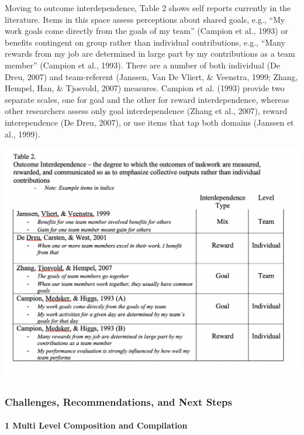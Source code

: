 \documentclass[english,,man]{apa6}
\let\oldparagraph\paragraph
\renewcommand{\paragraph}[1]{\oldparagraph{#1}\mbox{}}
\theoremstyle{definition}
\theoremstyle{definition}
\theoremstyle{definition}
\theoremstyle{remark}
\begin{document}
Moving to outcome interdependence, Table 2 shows self reports currently
in the literature. Items in this space assess perceptions about shared
goals, e.g., \enquote{My work goals come directly from the goals of my
team} (Campion et al., 1993) or benefits contingent on group rather than
individual contributions, e.g., \enquote{Many rewards from my job are
determined in large part by my contributions as a team member} (Campion
et al., 1993). There are a number of both individual (De Dreu, 2007) and
team-referent (Janssen, Van De Vliert, \& Veenstra, 1999; Zhang, Hempel,
Han, \& Tjosvold, 2007) measures. Campion et al. (1993) provide two
separate scales, one for goal and the other for reward interdependence,
whereas other researchers assess only goal interdependence (Zhang et
al., 2007), reward interependence (De Dreu, 2007), or use items that tap
both domains (Janssen et al., 1999).

\includegraphics{images/table2.png}

\hypertarget{challenges-recommendations-and-next-steps}{%
\subsubsection{Challenges, Recommendations, and Next
Steps}\label{challenges-recommendations-and-next-steps}}

\hypertarget{multi-level-composition-and-compilation}{%
\paragraph{1 Multi Level Composition and
Compilation}\label{multi-level-composition-and-compilation}}
\end{document}
